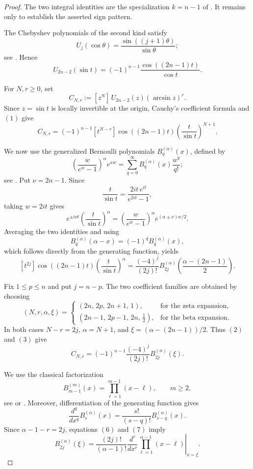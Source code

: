 \documentclass[11pt,twoside]{article}
\numberwithin{equation}{section}
\begin{document}
\begin{proof}
The two integral identities are the specialization \(k=n-1\) of
\cite[Prop.~1.2]{TallaWaffo2026}.  It remains only to establish the
asserted sign pattern.

The Chebyshev polynomials of the second kind satisfy
\[
U_j(\cos\theta)
=
\frac{\sin((j+1)\theta)}{\sin\theta};
\]
see \cite[Eq.~(18.5.2)]{NIST:DLMF}. Hence
\[
U_{2n-2}(\sin t)
=
(-1)^{n-1}
\frac{\cos((2n-1)t)}{\cos t}.
\tag{1}
\]

For \(N,r\geq0\), set
\[
C_{N,r}
:=
[z^N]\,U_{2n-2}(z)(\arcsin z)^r.
\]
Since \(z=\sin t\) is locally invertible at the origin, Cauchy's
coefficient formula and \((1)\) give
\[
C_{N,r}
=
(-1)^{n-1}
[t^{N-r}]
\cos((2n-1)t)
\left(\frac{t}{\sin t}\right)^{N+1}.
\tag{2}
\]

We now use the generalized Bernoulli polynomials \(B_q^{(\alpha)}(x)\),
defined by
\[
\left(\frac{w}{e^w-1}\right)^\alpha e^{xw}
=
\sum_{q=0}^{\infty}
B_q^{(\alpha)}(x)\frac{w^q}{q!};
\]
see \cite[Eq.~(24.16.1)]{NIST:DLMF}. Put
\(\nu=2n-1\). Since
\[
\frac{t}{\sin t}
=
\frac{2it\,e^{it}}{e^{2it}-1},
\]
taking \(w=2it\) gives
\[
e^{\pm i\nu t}
\left(\frac{t}{\sin t}\right)^\alpha
=
\left(\frac{w}{e^w-1}\right)^\alpha
e^{(\alpha\pm\nu)w/2}.
\]
Averaging the two identities and using
\[
B_q^{(\alpha)}(\alpha-x)
=
(-1)^q B_q^{(\alpha)}(x),
\]
which follows directly from the generating function, yields
\[
[t^{2j}]
\cos((2n-1)t)
\left(\frac{t}{\sin t}\right)^\alpha
=
\frac{(-4)^j}{(2j)!}
B_{2j}^{(\alpha)}
\left(
\frac{\alpha-(2n-1)}{2}
\right).
\tag{3}
\]

Fix \(1\leq p\leq n\) and put \(j=n-p\). The two coefficient families
are obtained by choosing
\[
(N,r,\alpha,\xi)
=
\begin{cases}
(2n,\,2p,\,2n+1,\,1),
& \text{for the zeta expansion},\\[2mm]
(2n-1,\,2p-1,\,2n,\,\frac12),
& \text{for the beta expansion}.
\end{cases}
\tag{4}
\]
In both cases \(N-r=2j\), \(\alpha=N+1\), and
\(\xi=(\alpha-(2n-1))/2\). Thus \((2)\) and \((3)\) give
\[
C_{N,r}
=
(-1)^{n-1}
\frac{(-4)^j}{(2j)!}
B_{2j}^{(\alpha)}(\xi).
\tag{5}
\]

We use the classical factorization
\[
B_{m-1}^{(m)}(x)
=
\prod_{\ell=1}^{m-1}(x-\ell),
\qquad m\geq2,
\tag{6}
\]
see \cite[p.~147]{Norlund1924} or
\cite[Eq.~(28)]{DilcherVignat2017}.
Moreover, differentiation of the generating function gives
\[
\frac{d^q}{dx^q}B_s^{(\alpha)}(x)
=
\frac{s!}{(s-q)!}B_{s-q}^{(\alpha)}(x).
\tag{7}
\]
Since \(\alpha-1-r=2j\), equations \((6)\) and \((7)\) imply
\[
B_{2j}^{(\alpha)}(\xi)
=
\frac{(2j)!}{(\alpha-1)!}
\left.
\frac{d^r}{dx^r}
\prod_{\ell=1}^{\alpha-1}(x-\ell)
\right|_{x=\xi}.
\tag{8}
\]


\end{proof}
\end{document}
